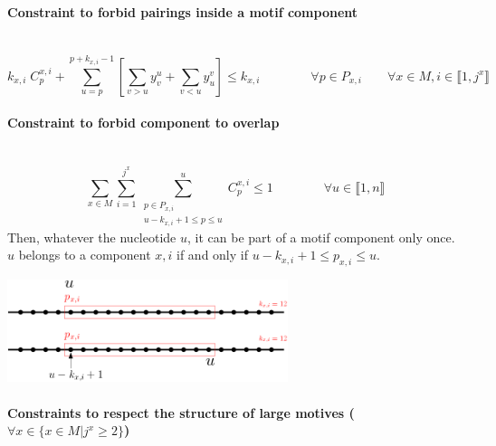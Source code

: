 \documentclass{article}
\begin{document}
\paragraph{Constraint to forbid pairings inside a motif component} ~ 
\begin{equation} \label{constraint:4}
	k_{x,i} \; C^{x,i}_p + \sum_{u=p}^{p+k_{x,i}-1}\left[ \sum_{v>u} y^u_v + \sum_{v<u} y^v_u \right] \leq k_{x,i} 
	\qquad \qquad \forall p \in P_{x,i} \qquad \forall x \in M, i \in \llbracket 1,j^x \rrbracket
\end{equation}
	
\paragraph{Constraint to forbid component to overlap} ~
\begin{equation} \label{constraint:5}
	\sum_{x \in M} \sum_{i=1}^{j^x}\sum_{\substack{p \in P_{x,i}\\u-k_{x,i}+1 \leq p \leq u}}^u C^{x,i}_p \leq 1 \qquad \qquad \forall u \in \llbracket 1,n \rrbracket
\end{equation}
Then, whatever the nucleotide $u$, it can be part of a motif component only once. 
$u$ belongs to a component $x,i$ if and only if $u-k_{x,i}+1 \leq p_{x,i} \leq u$.\\
\begin{center}\includegraphics[height=3cm]{component.png}\end{center}
	
\paragraph{Constraints to respect the structure of large motives ($\forall x \in \{ x\in M | j^x \geq 2\}$)} ~ 
\end{document}
